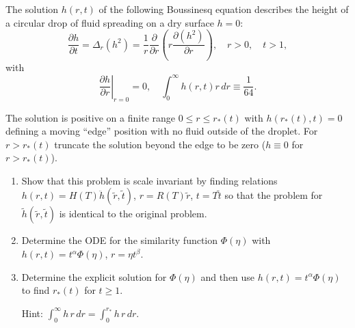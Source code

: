 \begin{exercise}
\label{applied:2012:9}
The solution $h(r,t)$ of the following Boussinesq equation describes the height of a circular drop of fluid spreading on a dry surface $h=0$:
\[
\frac{\partial h}{\partial t}=\Delta_{r}(h^{2})=\frac{1}{r}\frac{\partial}{\partial r}\left(r\frac{\partial(h^{2})}{\partial r}\right),\quad r>0,\quad t>1,
\]
with
\[
\left.\frac{\partial h}{\partial r}\right|_{r=0}=0,\quad\int_{0}^{\infty}h(r,t)r\,dr\equiv\frac{1}{64}.
\]

The solution is positive on a finite range $0\leq r\leq r_{*}(t)$ with $h(r_{*}(t),t)=0$ defining a moving ``edge'' position with no fluid outside of the droplet. For $r>r_{*}(t)$ truncate the solution beyond the edge to be zero ($h\equiv0$ for $r>r_{*}(t)$).

\begin{enumerate}
    \item[(a)] Show that this problem is scale invariant by finding relations $h(r,t)=H(T)\ddot{h}(\tilde{r},\tilde{t})$, $r=R(T)\tilde{r}$, $t=T\tilde{t}$ so that the problem for $\tilde{h}(\tilde{r},\tilde{t})$ is identical to the original problem.
    \item[(b)] Determine the ODE for the similarity function $\Phi(\eta)$ with $h(r,t)=t^{\alpha}\Phi(\eta)$, $r=\eta t^{\beta}$.
    \item[(c)] Determine the explicit solution for $\Phi(\eta)$ and then use $h(r,t)=t^{\alpha}\Phi(\eta)$ to find $r_{*}(t)$ for $t\geq1$.

    Hint: $\displaystyle\int_{0}^{\infty}h\,r\,dr=\int_{0}^{r_{*}}h\,r\,dr$.
\end{enumerate}
\end{exercise}

